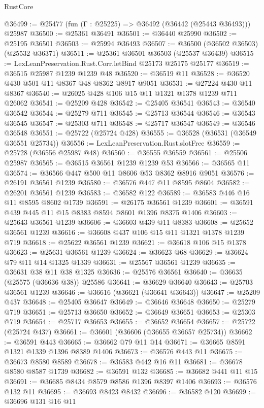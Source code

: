\begin{lexlean}{RustCore}
\begin{coremodule}
@36499 := @25477 (fun (Γ : @25225) => @36492 (@36442 (@25443 @36493))) @25987
@36500 := @25361 @36491
@36501 := @36440 @25990
@36502 := @25195 @36501
@36503 := @25994 @36493
@36507 := @36500 (@36502 @36503) (@25532 @36371)
@36511 := @25361 @36501 @36503 (@25537 @36439)
@36515 := LexLeanPreservation.Rust.Corr.letBind @25173 @25175 @25177
@36519 := @36515 @25987 @1239 @1239 @48
@36520 := @36519 @11
@36528 := @36520 @430 @501 @11 @8367 @48 @8362 @8917 @9051
@36531 := @27224 @430 @11 @8367
@36540 := @26025 @428 @106 @15 @11 @1321 @1378 @1239 @711 @26062
@36541 := @25209 @428
@36542 := @25405 @36541
@36543 := @36540 @36542
@36544 := @25279 @711
@36545 := @25713 @36544
@36546 := @36543 @36545
@36547 := @25303 @711
@36548 := @25717 @36547
@36549 := @36546 @36548
@36551 := @25722 (@25724 @428)
@36555 := @36528 (@36531 (@36549 @36551 @25734))
@36556 := LexLeanPreservation.Rust.slotFree
@36559 := @25728 (@36556 @25987 @48)
@36560 := @36555 @36559
@36561 := @25506 @25987
@36565 := @36515 @36561 @1239 @1239 @53
@36566 := @36565 @11
@36574 := @36566 @447 @500 @11 @8606 @53 @8362 @8916 @9051
@36576 := @26191 @36561 @1239
@36580 := @36576 @447 @11 @8595 @8604
@36582 := @26201 @36561 @1239
@36583 := @36582 @122
@36589 := @36583 @446 @16 @11 @8595 @8602 @1739
@36591 := @26175 @36561 @1239
@36601 := @36591 @439 @445 @11 @15 @8383 @8594 @8601 @1396 @8375 @1406
@36603 := @25643 @36561 @1239
@36606 := @36603 @439 @11 @8383
@36608 := @25652 @36561 @1239
@36616 := @36608 @437 @106 @15 @11 @1321 @1378 @1239 @719
@36618 := @25622 @36561 @1239
@36621 := @36618 @106 @15 @1378
@36623 := @25631 @36561 @1239
@36624 := @36623 @68
@36629 := @36624 @79 @11 @14 @1325 @1339
@36631 := @25567 @36561 @1239
@36635 := @36631 @38 @11 @38 @1325
@36636 := @25576 @36561
@36640 := @36635 (@25575 (@36636 @38)) @25586
@36641 := @36629 @36640
@36643 := @25703 @36561 @1239
@36646 := @36616 (@36621 (@36641 @36643))
@36647 := @25209 @437
@36648 := @25405 @36647
@36649 := @36646 @36648
@36650 := @25279 @719
@36651 := @25713 @36650
@36652 := @36649 @36651
@36653 := @25303 @719
@36654 := @25717 @36653
@36655 := @36652 @36654
@36657 := @25722 (@25724 @437)
@36661 := @36601 (@36606 (@36655 @36657 @25734))
@36662 := @36591 @443
@36665 := @36662 @79 @11 @14
@36671 := @36665 @8591 @1321 @1339 @1396 @8389 @1406
@36673 := @36576 @443 @11
@36675 := @36673 @8580 @8589
@36678 := @36583 @442 @16 @11
@36681 := @36678 @8580 @8587 @1739
@36682 := @36591 @132
@36685 := @36682 @441 @11 @15
@36691 := @36685 @8434 @8579 @8586 @1396 @8397 @1406
@36693 := @36576 @132 @11
@36695 := @36693 @8423 @8432
@36696 := @36582 @120
@36699 := @36696 @131 @16 @11

\end{coremodule}
\end{lexlean}

